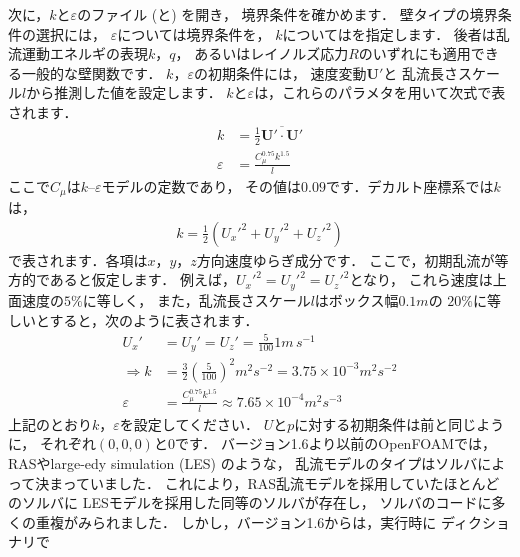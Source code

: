 次に，$k$と$\varepsilon$のファイル (と) を開き，
境界条件を確かめます．
壁タイプの境界条件の選択には，
$\varepsilon$については境界条件を，
$k$についてはを指定します．
後者は乱流運動エネルギの表現$k$，$q$，
あるいはレイノルズ応力$R$のいずれにも適用できる一般的な壁関数です．
$k$，$\varepsilon$の初期条件には，
速度変動$\bm{U}'$と
%
乱流長さスケール$l$から推測した値を設定します．
$k$と$\varepsilon$は，これらのパラメタを用いて次式で表されます．
\begin{align}
 \label{eq:2.8}
  k &= \frac{1}{2}\overline{\bm{U}' \cdot \bm{U}'} \\
 \label{eq:2.9}
 \varepsilon &= \frac{C_{\mu}^{0.75}k^{1.5}}{l}
\end{align}
ここで$C_{\mu}$は$k$--$\varepsilon$モデルの定数であり，
その値は$0.09$です．デカルト座標系では$k$は，
\begin{align}
 \label{eq:2.10}
 k = \frac{1}{2}({U_{x}'}^{2} + {U_{y}'}^{2} + {U_{z}'}^{2})
\end{align}
で表されます．各項は$x$，$y$，$z$方向速度ゆらぎ成分です．
ここで，初期乱流が等方的であると仮定します．
例えば，${U_{x}'}^{2} = {U_{y}'}^{2} = {U_{z}'}^{2}$となり，
これら速度は上面速度の$5\unit{\%}$に等しく，
また，乱流長さスケール$l$はボックス幅$0.1\unit{m}$の
$20\unit{\%}$に等しいとすると，次のように表されます．
\begin{align}
 \label{eq:2.11}
 U_{x}' &= U_{y}' = U_{z}' = \frac{5}{100}1\unit{m\,s^{-1}} \\
 \label{eq:2.12}
 \Rightarrow k &= \frac{3}{2}\left(\frac{5}{100}\right)^{2}\unit{m^{2}s^{-2}}
 = 3.75 \times 10^{-3}\unit{m^{2}s^{-2}} \\
 \label{eq:2.13}
 \varepsilon &= \frac{C_{\mu}^{0.75}k^{1.5}}{l}
 \approx 7.65 \times 10^{-4}\unit{m^{2}s^{-3}}
\end{align}
上記のとおり$k$，$\varepsilon$を設定してください．
$U$と$p$に対する初期条件は前と同じように，
それぞれ$(0, 0, 0)$と$0$です．
バージョン1.6より以前のOpenFOAMでは，
RASやlarge-edy simulation (LES) のような，
乱流モデルのタイプはソルバによって決まっていました．
これにより，RAS乱流モデルを採用していたほとんどのソルバに
LESモデルを採用した同等のソルバが存在し，
ソルバのコードに多くの重複がみられました．
しかし，バージョン1.6からは，実行時に
%
%
ディクショナリで
